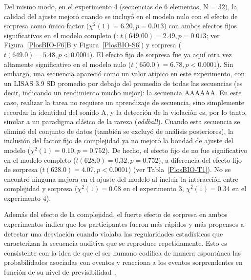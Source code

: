 Del mismo modo, en el experimento 4 (secuencias de 6 elementos, N = 32), la calidad del ajuste mejoró cuando \mdlbin se incluyó en el modelo nulo con el efecto de sorpresa como único factor ($\chi^2(1) = 6.20, p= 0.013$) con ambos efectos fijos significativos en el modelo completo (\mdlbin: $t (649.00) = 2.49, p= 0.013$; ver Figura~\ref{PlosBIO-F6}B y Figura~\ref{PlosBIO-S6}) y sorpresa ($t (649.0) = 5.48, p < 0.0001$). El efecto fijo de sorpresa fue ya aquí otra vez altamente significativo en el modelo nulo ($t (650.0) = 6.78, p < 0.0001$). Sin embargo, una secuencia apareció como un valor atípico en este experimento, con un LISAS $3.9$ SD promedio por debajo del promedio de todas las secuencias (es decir, indicando un rendimiento mucho mejor): la secuencia AAAAAA. En este caso, realizar la tarea no requiere un aprendizaje de secuencia, sino simplemente recordar la identidad del sonido A, y la detección de la violación es, por lo tanto, similar a un paradigma clásico de la  rareza (\textit{oddball}). Cuando esta secuencia se eliminó del conjunto de datos (también se excluyó de análisis posteriores), la inclusión del factor fijo de complejidad ya no mejoró la bondad de ajuste del modelo ($\chi^2 (1) = 0.10, p = 0.752$). De hecho, el efecto fijo de \mdlbin no fue significativo en el modelo completo ($t (628.0) = 0.32, p = 0.752$), a diferencia del efecto fijo de sorpresa ($t (628.0) = 4.07, p < 0.0001$) (ver Tabla~\ref{PlosBIO-T1}). No se encontró ninguna mejora en el ajuste del modelo al incluir la interacción entre complejidad y sorpresa ($\chi^2(1) = 0.08$ en el experimento 3, $\chi^2(1) = 0.34$ en el experimento 4).


Además del efecto de la complejidad, el fuerte efecto de sorpresa en ambos experimentos indica que los participantes fueron más rápidos y más propensos a detectar una desviación cuando violaba las regularidades estadísticas que caracterizan la secuencia auditiva que se reproduce repetidamente. Esto es consistente con la idea de que el ser humano codifica de manera espontánea las probabilidades asociadas con eventos y reacciona a los eventos sorprendentes en función de su nivel de previsibilidad~\cite{f19,f22}.

